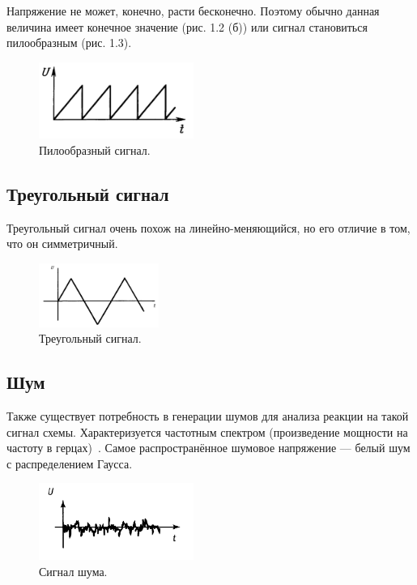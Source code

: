 	Напряжение не может, конечно, расти бесконечно. Поэтому обычно данная величина имеет конечное значение (рис. 1.2 (б)) или сигнал становиться пилообразным (рис. 1.3).

	\begin{figure}[H]
    \centering
    \includegraphics[width=0.45\textwidth]{../image/s_saw.png}
    \caption{Пилообразный сигнал.}
	\end{figure}

\subsection{Треугольный сигнал}
	Треугольный сигнал очень похож на линейно-меняющийся, но его отличие в том, что он симметричный.

	\begin{figure}[H]
    \centering
    \includegraphics[width=0.35\textwidth]{../image/s_tri.png}
    \caption{Треугольный сигнал.}
	\end{figure}

\subsection{Шум}
	
	Также существует потребность в генерации шумов для анализа реакции на такой сигнал схемы. Характеризуется частотным спектром (произведение мощности на частоту в герцах)~\cite{is1}. Самое распространённое шумовое напряжение --- белый шум с распределением Гаусса.  

	\begin{figure}[H]
    \centering
    \includegraphics[width=0.45\textwidth]{../image/s_noise.png}
    \caption{Сигнал шума.}
	\end{figure}

